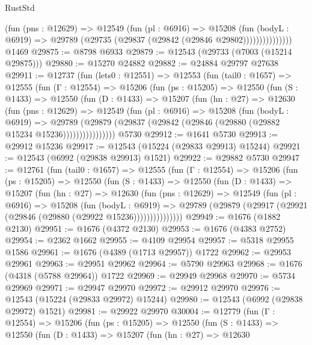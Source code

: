 \begin{lexlean}{RustStd}
\begin{coremodule}
                    (fun (pns : @12629) =>
                    @12549
                      (fun (pl : @6916) =>
                      @15208
                        (fun (bodyL : @6919) =>
                        @29789 (@29735 (@29837 (@29842 (@29846 @29802)))))))))))))))
    @1469
@29875 := @8798 @6933
@29879 := @12543 (@29733 (@7003 (@15214 @29875)))
@29880 := @15270 @24882
@29882 := @24884 @29797 @27638
@29911 := @12737
    (fun (lets0 : @12551) =>
    @12553
      (fun (tail0 : @1657) =>
      @12555
        (fun (Γ : @12554) =>
        @15206
          (fun (ps : @15205) =>
          @12550
            (fun (S : @1433) =>
            @12550
              (fun (D : @1433) =>
              @15207
                (fun (hn : @27) =>
                @12630
                  (fun (pns : @12629) =>
                  @12549
                    (fun (pl : @6916) =>
                    @15208
                      (fun (bodyL : @6919) =>
                      @29789
                        (@29879
                          (@29837 (@29842 (@29846 (@29880 (@29882 @15234 @15236))))))))))))))))
    @5730
@29912 := @1641 @5730
@29913 := @29912 @15236
@29917 := @12543 (@15224 (@29833 @29913) @15244)
@29921 := @12543 (@6992 (@29838 @29913) @1521)
@29922 := @29882 @5730
@29947 := @12761
    (fun (tail0 : @1657) =>
    @12555
      (fun (Γ : @12554) =>
      @15206
        (fun (ps : @15205) =>
        @12550
          (fun (S : @1433) =>
          @12550
            (fun (D : @1433) =>
            @15207
              (fun (hn : @27) =>
              @12630
                (fun (pns : @12629) =>
                @12549
                  (fun (pl : @6916) =>
                  @15208
                    (fun (bodyL : @6919) =>
                    @29789 (@29879 (@29917 (@29921 (@29846 (@29880 (@29922 @15236)))))))))))))))
@29949 := @1676 (@1882 @2130)
@29951 := @1676 (@4372 @2130)
@29953 := @1676 (@4383 @2752)
@29954 := @2362 @1662
@29955 := @4109 @29954
@29957 := @5318 @29955 @1586
@29961 := @1676 (@4389 (@1713 @29957)) @1722
@29962 := @29953 @29961
@29963 := @29951 @29962
@29964 := @5790 @29963
@29968 := @1676 (@4318 (@5788 @29964)) @1722
@29969 := @29949 @29968
@29970 := @5734 @29969
@29971 := @29947 @29970
@29972 := @29912 @29970
@29976 := @12543 (@15224 (@29833 @29972) @15244)
@29980 := @12543 (@6992 (@29838 @29972) @1521)
@29981 := @29922 @29970
@30004 := @12779
    (fun (Γ : @12554) =>
    @15206
      (fun (ps : @15205) =>
      @12550
        (fun (S : @1433) =>
        @12550
          (fun (D : @1433) =>
          @15207
            (fun (hn : @27) =>
            @12630

\end{coremodule}
\end{lexlean}

